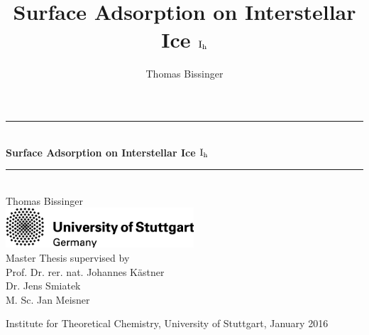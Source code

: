\newcommand{\itemEq}[1]{%
        \begingroup%
        \setlength{\abovedisplayskip}{0pt}%
        \setlength{\belowdisplayskip}{0pt}%
        \parbox[c]{\linewidth}{\begin{flalign}#1&&\end{flalign}}%
        \endgroup}


\parindent0pt

\title{Surface Adsorption on Interstellar Ice $\text I_\text h$}
\author{Thomas Bissinger}


\linespread{1.5}

\begin{titlepage}

\begin{center}


\newcommand{\HRule}{\rule{\linewidth}{0.5mm}}

\HRule \\[0.4cm]

{ \huge \bfseries Surface Adsorption on Interstellar Ice $\text I_\text h$}


\HRule \\[2cm]

{\LARGE Thomas Bissinger}\\[4cm]

\vfill 
\includegraphics[width=7cm]{./img/unilogo_international.png}\\[2cm]   

{\Large Master Thesis supervised by \\[.4cm]
Prof. Dr. rer. nat. Johannes Kästner \\[.4cm]
Dr. Jens Smiatek \\[.4cm]
M. Sc. Jan Meisner\\[.8cm]}


{ \Large  Institute for Theoretical Chemistry, University of Stuttgart, January
2016}

\end{center}

\end{titlepage}
\thispagestyle{empty}
\cleardoublepage



